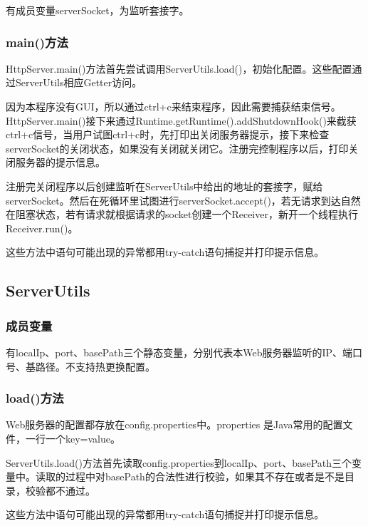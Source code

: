 \documentclass[UTF8,12pt]{ctexart}
\begin{document}
有成员变量serverSocket，为监听套接字。

\subsubsection{main()方法}

HttpServer.main()方法首先尝试调用ServerUtils.load()，初始化配置。这些配置通过ServerUtils相应Getter访问。

因为本程序没有GUI，所以通过ctrl+c来结束程序，因此需要捕获结束信号。HttpServer.main()接下来通过Runtime.getRuntime().addShutdownHook()来截获ctrl+c信号，当用户试图ctrl+c时，先打印出关闭服务器提示，接下来检查serverSocket的关闭状态，如果没有关闭就关闭它。注册完控制程序以后，打印关闭服务器的提示信息。

注册完关闭程序以后创建监听在ServerUtils中给出的地址的套接字，赋给serverSocket。然后在死循环里试图进行serverSocket.accept()，若无请求到达自然在阻塞状态，若有请求就根据请求的socket创建一个Receiver，新开一个线程执行Receiver.run()。

\vspace*{2\baselineskip} 

这些方法中语句可能出现的异常都用try-catch语句捕捉并打印提示信息。

\subsection{ServerUtils}

\subsubsection{成员变量}

有localIp、port、basePath三个静态变量，分别代表本Web服务器监听的IP、端口号、基路径。不支持热更换配置。

\subsubsection{load()方法}

Web服务器的配置都存放在config.properties中。properties 是Java常用的配置文件，一行一个key=value。

ServerUtils.load()方法首先读取config.properties到localIp、port、basePath三个变量中。读取的过程中对basePath的合法性进行校验，如果其不存在或者是不是目录，校验都不通过。

\vspace*{2\baselineskip} 

这些方法中语句可能出现的异常都用try-catch语句捕捉并打印提示信息。
\end{document}
